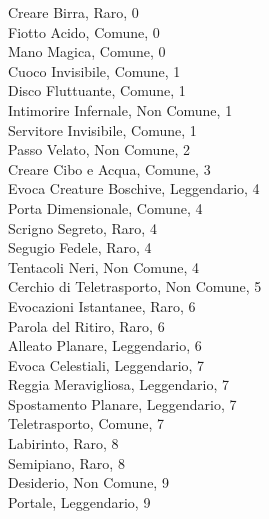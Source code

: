 \begin{multicols}{3}
Creare Birra, Raro, 0\\
Fiotto Acido, Comune, 0\\
Mano Magica, Comune, 0\\
Cuoco Invisibile, Comune, 1\\
Disco Fluttuante, Comune, 1\\
Intimorire Infernale, Non Comune, 1\\
Servitore Invisibile, Comune, 1\\
Passo Velato, Non Comune, 2\\
Creare Cibo e Acqua, Comune, 3\\
Evoca Creature Boschive, Leggendario, 4\\
Porta Dimensionale, Comune, 4\\
Scrigno Segreto, Raro, 4\\
Segugio Fedele, Raro, 4\\
Tentacoli Neri, Non Comune, 4\\
Cerchio di Teletrasporto, Non Comune, 5\\
Evocazioni Istantanee, Raro, 6\\
Parola del Ritiro, Raro, 6\\
Alleato Planare, Leggendario, 6\\
Evoca Celestiali, Leggendario, 7\\
Reggia Meravigliosa, Leggendario, 7\\
Spostamento Planare, Leggendario, 7\\
Teletrasporto, Comune, 7\\
Labirinto, Raro, 8\\
Semipiano, Raro, 8\\
Desiderio, Non Comune, 9\\
Portale, Leggendario, 9\\



\end{multicols}
